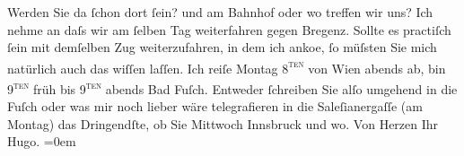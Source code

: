 \begin{ledgroupsized}[t]{13cm}
               Werden Sie da ſchon dort ſein? und am Bahnhof oder wo treffen wir uns? Ich nehme an daſs wir am
               ſelben Tag weiterfahren gegen Bregenz. Sollte
               es practiſch ſein mit demſelben {\pb}Zug weiterzufahren, in dem ich anko{\geminationm}e, ſo müſsten Sie
               mich natürlich auch das wiſſen laſſen. Ich reiſe Montag 8\textsc{\textsuperscript{ten}} von Wien abends ab, bin 9\textsc{\textsuperscript{ten}}{ }früh bis 9\textsc{\textsuperscript{ten}}{ }abends{ }Bad Fuſch. Entweder ſchreiben Sie alſo umgehend
               in die Fuſch oder was mir noch lieber wäre {\pb}telegrafieren in die Saleſianergaſſe (am Montag) das
               Dringendſte, ob Sie Mittwoch{ }Innsbruck und wo.\pend
           \pstart
           Von Herzen Ihr{\\[\baselineskip]}\spacefill\mbox{Hugo.}\pend
           \leftskip=0em{}
         
         \endnumbering{}\end{ledgroupsized}  \newcommand{\dateiname}{L00831}\newcommand{\titel}{Hugo von Hofmannsthal an Arthur Schnitzler, 6. 8. [1898]}\newcommand{\editorInnen}{Martin Anton Müller und Gerd-Hermann Susen}
      